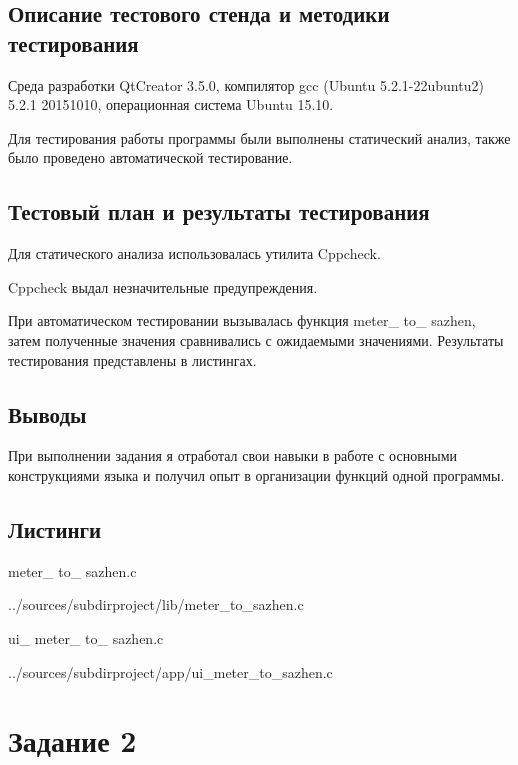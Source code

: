 \documentclass[12pt,a4paper]{report}
\begin{document}
\subsection{Описание тестового стенда и методики тестирования}
Среда разработки QtCreator 3.5.0, компилятор gcc (Ubuntu 5.2.1-22ubuntu2) 5.2.1 20151010, операционная система Ubuntu 15.10.

Для тестирования работы программы были выполнены статический анализ, также было проведено автоматической тестирование.

\subsection{Тестовый план и результаты тестирования}
		Для статического анализа использовалась утилита Cppcheck.
		
		\vspace{\baselineskip}
		 Cppcheck выдал незначительные предупреждения.
		
		\vspace{\baselineskip}
		При автоматическом тестировании вызывалась функция meter\_ to\_ sazhen, затем полученные значения сравнивались с ожидаемыми значениями. Результаты тестирования представлены в листингах.
		
		\vspace{\baselineskip}
	 

 
\subsection{Выводы}

При выполнении задания я отработал свои навыки в работе с основными конструкциями языка и получил опыт в организации функций одной программы.

\subsection*{Листинги}

meter\_ to\_ sazhen.c

{../sources/subdirproject/lib/meter_to_sazhen.c}

\vspace{\baselineskip}

ui\_ meter\_ to\_ sazhen.c

{../sources/subdirproject/app/ui_meter_to_sazhen.c}


\section{Задание 2}
\end{document}
